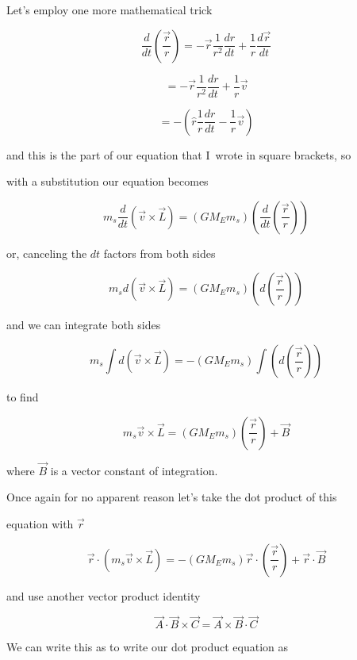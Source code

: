 Let's employ one more mathematical trick%

$$\frac{d}{dt}\left( \frac{\overrightarrow{r}}{r}\right) =-\overrightarrow{r} \frac{1}{r^{2}}\frac{dr}{dt}+\frac{1}{r}\frac{d\overrightarrow{r}}{dt}
$$

$$=-\overrightarrow{r}\frac{1}{r^{2}}\frac{dr}{dt}+\frac{1}{r}\overrightarrow{v}
$$

$$=-\left( \hat{r}\frac{1}{r}\frac{dr}{dt}-\frac{1}{r}\overrightarrow{v}\right)$$

and this is the part of our equation that I\ wrote in square brackets, so

with a substitution our equation becomes%

$$m_{s}\frac{d}{dt}\left( \overrightarrow{v}\times \overrightarrow{L}\right)=\left( GM_{E}m_{s}\right) \left( \frac{d}{dt}\left( \frac{\overrightarrow{r}}{r}\right) \right) $$

or, canceling the $dt$ factors from both sides%

$$m_{s}d\left( \overrightarrow{v}\times \overrightarrow{L}\right) =\left(GM_{E}m_{s}\right) \left( d\left( \frac{\overrightarrow{r}}{r}\right)\right)
$$

and we can integrate both sides%

$$m_{s}\int d\left( \overrightarrow{v}\times \overrightarrow{L}\right)=-\left( GM_{E}m_{s}\right) \int \left( d\left( \frac{\overrightarrow{r}}{r}\right) \right)
$$

to find 

$$m_{s}\overrightarrow{v}\times \overrightarrow{L}=\left( GM_{E}m_{s}\right)\left( \frac{\overrightarrow{r}}{r}\right) +\overrightarrow{B}
$$

where $\overrightarrow{B}$ is a vector constant of integration.


Once again for no apparent reason let's take the dot product of this

equation with $\overrightarrow{r}$%

$$\overrightarrow{r}\cdot \left( m_{s}\overrightarrow{v}\times \overrightarrow{L}\right) =-\left( GM_{E}m_{s}\right) \overrightarrow{r}\cdot \left( \frac{\overrightarrow{r}}{r}\right) +\overrightarrow{r}\cdot \overrightarrow{B} 
$$

and use another vector product identity%

$$\overrightarrow{A}\cdot \overrightarrow{B}\times \overrightarrow{C}=\overrightarrow{A}\times \overrightarrow{B}\cdot \overrightarrow{C} 
$$

We can write this as to write our dot product equation as 

